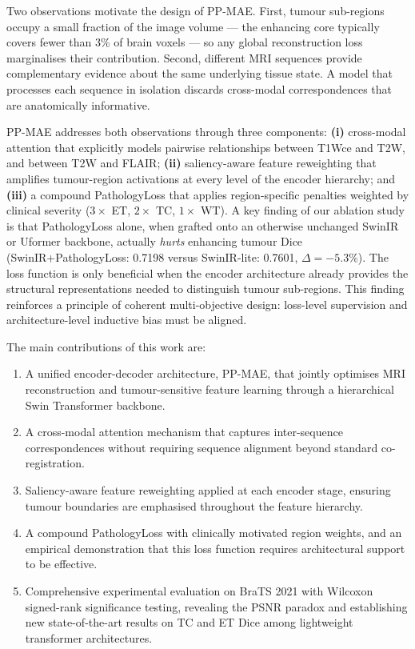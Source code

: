 \documentclass[conference]{IEEEtran}
\begin{document}
Two observations motivate the design of PP-MAE. First, tumour
sub-regions occupy a small fraction of the image volume — the enhancing
core typically covers fewer than 3\% of brain voxels — so any
global reconstruction loss marginalises their contribution.
Second, different MRI sequences provide complementary evidence
about the same underlying tissue state. A model that processes
each sequence in isolation discards cross-modal correspondences that
are anatomically informative.

PP-MAE addresses both observations through three components:
\textbf{(i)} cross-modal attention that explicitly models pairwise
relationships between T1Wce and T2W, and between T2W and FLAIR;
\textbf{(ii)} saliency-aware feature reweighting that amplifies
tumour-region activations at every level of the encoder hierarchy;
and \textbf{(iii)} a compound PathologyLoss that applies
region-specific penalties weighted by clinical severity
($3\times$ ET, $2\times$ TC, $1\times$ WT). A key finding of our
ablation study is that PathologyLoss alone, when grafted onto an
otherwise unchanged SwinIR or Uformer backbone, actually
\emph{hurts} enhancing tumour Dice (SwinIR+PathologyLoss: 0.7198
versus SwinIR-lite: 0.7601, $\Delta = -5.3\%$). The loss function
is only beneficial when the encoder architecture already provides
the structural representations needed to distinguish tumour
sub-regions. This finding reinforces a principle of coherent
multi-objective design: loss-level supervision and architecture-level
inductive bias must be aligned.

The main contributions of this work are:
\begin{enumerate}
  \item A unified encoder-decoder architecture, PP-MAE, that jointly
        optimises MRI reconstruction and tumour-sensitive feature
        learning through a hierarchical Swin Transformer backbone.
  \item A cross-modal attention mechanism that captures inter-sequence
        correspondences without requiring sequence alignment beyond
        standard co-registration.
  \item Saliency-aware feature reweighting applied at each encoder
        stage, ensuring tumour boundaries are emphasised throughout
        the feature hierarchy.
  \item A compound PathologyLoss with clinically motivated region
        weights, and an empirical demonstration that this loss
        function requires architectural support to be effective.
  \item Comprehensive experimental evaluation on BraTS 2021 with
        Wilcoxon signed-rank significance testing, revealing the
        PSNR paradox and establishing new state-of-the-art results
        on TC and ET Dice among lightweight transformer architectures.
\end{enumerate}
\end{document}
